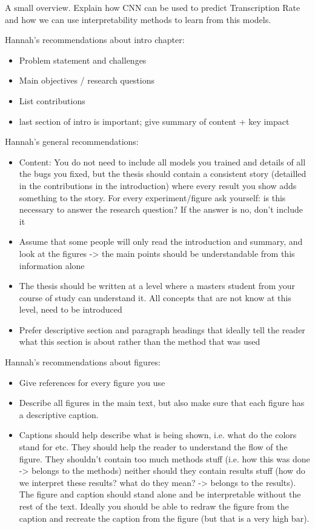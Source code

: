 A small overview. Explain how CNN can be used to predict Transcription Rate and how we can use interpretability methods to learn from this models.

Hannah's recommendations about intro chapter:
\begin{itemize}
  \item Problem statement and challenges
  \item Main objectives / research questions
  \item List contributions
  \item last section of intro is important; give summary of content + key impact
\end{itemize}

Hannah's general recommendations:
\begin{itemize}
  \item Content: You do not need to include all models you trained and details of all the bugs you fixed, but the thesis should contain a consistent story (detailled in the contributions in the introduction) where every result you show adds something to the story. For every experiment/figure ask yourself: is this necessary to answer the research question? If the answer is no, don’t include it
  \item Assume that some people will only read the introduction and summary, and look at the figures -> the main points should be understandable from this information alone
  \item The thesis should be written at a level where a masters student from your course of study can understand it. All concepts that are not know at this level, need to be introduced
  \item Prefer descriptive section and paragraph headings that ideally tell the reader what this section is about rather than the method that was used
\end{itemize}

Hannah's recommendations about figures:
\begin{itemize}
  \item Give references for every figure you use
  \item Describe all figures in the main text, but also make sure that each figure has a descriptive caption.
  \item Captions should help describe what is being shown, i.e. what do the colors stand for etc. They should help the reader to understand the flow of the figure. They shouldn’t contain too much methods stuff (i.e. how this was done -> belongs to the methods) neither should they contain results stuff (how do we interpret these results? what do they mean? -> belongs to the results). The figure and caption should stand alone and be interpretable without the rest of the text. Ideally you should be able to redraw the figure from the caption and recreate the caption from the figure (but that is a very high bar).
\end{itemize}
